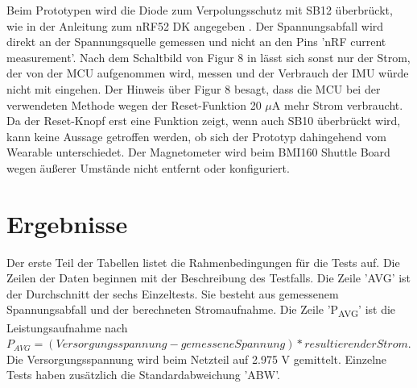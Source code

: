 Beim Prototypen wird die Diode zum Verpolungsschutz mit SB12 überbrückt, wie in der Anleitung zum nRF52 DK angegeben \cite{site_nrf52dk}.
Der Spannungsabfall wird direkt an der Spannungsquelle gemessen und nicht an den Pins 'nRF current measurement'.
Nach dem Schaltbild von Figur 8 in \cite{site_nrf52dk} lässt sich sonst nur der Strom, der von der MCU aufgenommen wird, messen und der Verbrauch der IMU würde nicht mit eingehen.
Der Hinweis über Figur 8 besagt, dass die MCU bei der verwendeten Methode wegen der Reset-Funktion 20 $\mu$A mehr Strom verbraucht.
Da der Reset-Knopf erst eine Funktion zeigt, wenn auch SB10 überbrückt wird, kann keine Aussage getroffen werden, ob sich der Prototyp dahingehend vom Wearable unterschiedet.
Der Magnetometer wird beim BMI160 Shuttle Board wegen äußerer Umstände nicht entfernt oder konfiguriert.

\section{Ergebnisse}
Der erste Teil der Tabellen listet die Rahmenbedingungen für die Tests auf.
Die Zeilen der Daten beginnen mit der Beschreibung des Testfalls.
Die Zeile 'AVG' ist der Durchschnitt der sechs Einzeltests.
Sie besteht aus gemessenem Spannungsabfall und der berechneten Stromaufnahme.
Die Zeile 'P\textsubscript{AVG}' ist die Leistungsaufnahme nach $P_{AVG} = (Versorgungsspannung - gemesseneSpannung) * resultierender Strom$.
Die Versorgungsspannung wird beim Netzteil auf 2.975 V gemittelt.
Einzelne Tests haben zusätzlich die Standardabweichung 'ABW'.


